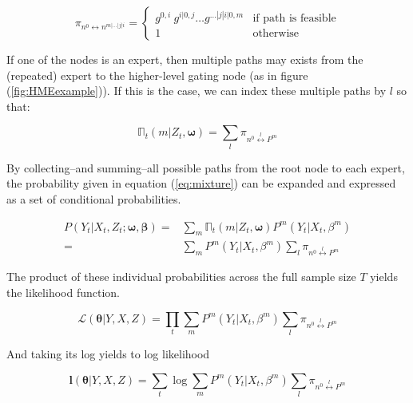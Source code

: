 \documentclass[12pt]{article}
\begin{document}
\begin{equation} \label{eq:gpath}
  \pi_{n^{0} \longleftrightarrow n^{m|\ldots|j|i}} =
    \begin{cases} 
       g^{0, i} \ g^{i|0, j} \ldots g^{\dots|j|i|0,m} & \textrm{if path is feasible} \\
       1 & \textrm{otherwise}
    \end{cases}
\end{equation}

If one of the nodes is an expert, then multiple paths may exists from the (repeated)
expert to the higher-level gating node (as in figure (\ref{fig:HMEexample})). If this is
the case, we can index these multiple paths by $l$ so that:

\begin{equation} \label{eq:pathsums}
  \mathbb{\Pi}_{t}(m | Z_{t}, \boldsymbol{\omega}) = \sum_{l}\pi_{n^{0} \overset{l}{\longleftrightarrow} P^{m}}
\end{equation}

By collecting--and summing--all possible paths from the root node to each
expert, the probability given in equation (\ref{eq:mixture}) can be expanded
and expressed as a set of conditional probabilities.

\begin{equation} \label{eq:contribution}
  \begin{split}
    P(Y_{t}|X_{t}, Z_{t}; \boldsymbol{\omega}, \boldsymbol{\beta}) =& \sum_{m} \mathbb{\Pi}_{t}(m | Z_{t}, \boldsymbol{\omega}) P^{m}(Y_{t}|X_{t},\beta^{m}) \\ 
      =& \sum_{m} P^{m}(Y_{t}|X_{t}, \beta^{m}) \sum_{l}\pi_{n^{0} \overset{l}{\longleftrightarrow} P^{m}}
  \end{split}
\end{equation}

The product of these individual probabilities across the full sample size $T$ yields
the likelihood function.

\begin{equation} \label{eq:likelihood}
  \mathcal{L}(\boldsymbol{\theta}| Y, X, Z) = \prod_{t}\sum_{m}P^{m}(Y_{t}|X_{t},\beta^{m})\sum_{l}\pi_{n^{0} \overset{l}{\longleftrightarrow} P^{m}}
\end{equation}

And taking its log yields to log likelihood

\begin{equation} \label{eq:loglikelihood}
  \boldsymbol{l}(\boldsymbol{\theta}|Y, X, Z) = \sum_{t}\log\sum_{m}P^{m}(Y_{t}|X_{t},\beta^{m})\sum_{l}\pi_{n^{0}\overset{l}{\longleftrightarrow} P^{m}}
\end{equation}
\end{document}
